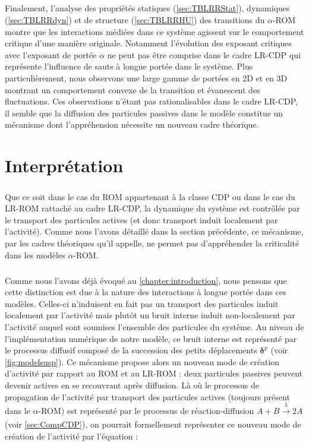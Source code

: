 \subparagraph{}Finalement, l'analyse des propriétés statiques (\autoref{sec:TBLRRStat}), dynamiques (\autoref{sec:TBLRRdyn}) et de structure (\autoref{sec:TBLRRHU}) des transitions du $\alpha$-ROM montre que les interactions médiées dans ce système agissent sur le comportement critique d'une manière originale. Notamment l'évolution des exposant critiques avec l'exposant de portée $\alpha$ ne peut pas être comprise dans le cadre LR-CDP qui représente l'influence de sauts à longue portée dans le système. Plus particulièrement, nous observons une large gamme de portées en 2D et en 3D montrant un comportement convexe de la transition et évanescent des fluctuations. Ces observations n'étant pas rationalisables dans le cadre LR-CDP, il semble que la diffusion des particules passives dans le modèle constitue un mécanisme dont l'appréhension nécessite un nouveau cadre théorique.

\section{Interprétation}

\label{sec:interpret}

\subparagraph{}Que ce soit dans le cas du ROM appartenant à la classe CDP ou dans le cas du LR-ROM rattaché au cadre LR-CDP, la dynamique du système est contrôlée par le transport des particules actives (et donc transport induit localement par l'activité). Comme nous l'avons détaillé dans la section précédente, ce mécanisme, par les cadres théoriques qu'il appelle, ne permet pas d'appréhender la criticalité dans les modèles $\alpha$-ROM.

\subparagraph{}Comme nous l'avons déjà évoqué au \autoref{chapter:introduction}, nous pensons que cette distinction est due à la nature des interactions à longue portée dans ces modèles. Celles-ci n'induisent en fait pas un transport des particules induit localement par l'activité mais plutôt un bruit interne induit non-localement par l'activité auquel sont soumises l'ensemble des particules du système. Au niveau de l'implémentation numérique de notre modèle, ce bruit interne est représenté par le processus diffusif composé de la succession des petits déplacements $\boldsymbol\delta^p$ (voir \autoref{fig:modelsusp}). Ce mécanisme propose alors un nouveau mode de création d'activité par rapport au ROM et au LR-ROM : deux particules passives peuvent devenir actives en se recouvrant après diffusion. Là où le processus de propagation de l'activité par transport des particules actives (toujours présent dans le $\alpha$-ROM) est représenté par le processus de réaction-diffusion $A +B \xrightarrow[]{\lambda} 2A$ (voir \autoref{sec:CompCDP}), on pourrait formellement représenter ce nouveau mode de création de l'activité par l'équation :

